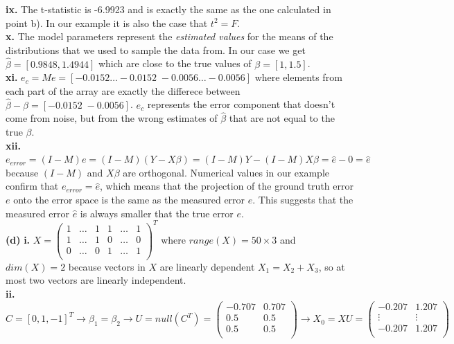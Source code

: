 \documentclass[11pt,a4paper,oneside]{report}
\begin{document}
\textbf{ix.} The t-statistic is -6.9923 and is exactly the same as the one calculated in point b). In our example it is also the case that $t^2 = F$.\\

\textbf{x. } The model parameters represent the \emph{estimated values} for the means of the distributions that we used to sample the data from. In our case we get $\hat{\beta} = [0.9848, 1.4944]$ which are close to the true values of $\beta = [1, 1.5]$. \\

\textbf{xi. } $e_c = M e = [-0.0152 \dots -0.0152 \; -0.0056 \dots -0.0056 ]$ where elements from each part of the array are exactly the differece between $\hat{\beta} - \beta = [-0.0152 \; -0.0056]$. $e_c$ represents the error component that doesn't come from noise, but from the wrong estimates of $\hat{\beta}$ that are not equal to the true $\beta$. \\

\textbf{xii. } $e_{error} = (I - M) e = (I - M) (Y - X\beta) = (I - M)Y - (I - M)X\beta = \hat{e} - 0 = \hat{e}$ because $(I-M)$ and $X\beta$ are orthogonal. Numerical values in our example confirm that $e_{error} = \hat{e}$, which means that the projection of the ground truth error $e$ onto the error space is the same as the measured error $\hat{e}$. This suggests that the measured error $\hat{e}$ is always smaller that the true error $e$. \\

\noindent \large{\textbf{(d)}} \textbf{i. } $X = \begin{pmatrix}
1 & \dots & 1 & 1 & \dots & 1\\
1 & \dots & 1 & 0 & \dots & 0\\
0 & \dots & 0 & 1 & \dots & 1\\
\end{pmatrix}^T$  where $range(X) = 50 \times 3$ and $dim(X) = 2$ because vectors in $X$ are linearly dependent $X_1 = X_2 + X_3$, so at most two vectors are linearly independent. \\

\textbf{ii. } $C = [0, 1, -1]^T \to \beta_1 = \beta_2 \to U = null(C^T) = \begin{pmatrix}
-0.707 & 0.707\\
0.5 & 0.5\\
0.5 & 0.5\\
\end{pmatrix} \to X_0 = X U = \begin{pmatrix}
-0.207 & 1.207\\
\vdots & \vdots\\
-0.207 & 1.207\\
\end{pmatrix}$\\
\end{document}
